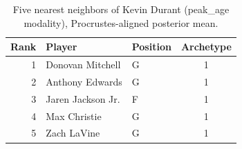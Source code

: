 \begin{table}[htbp]
  \centering\small
  \begin{tabular}{rllc}
    \toprule
    Rank & Player & Position & Archetype \\
    \midrule
    1 & Donovan Mitchell & G & 1 \\
    2 & Anthony Edwards & G & 1 \\
    3 & Jaren Jackson Jr. & F & 1 \\
    4 & Max Christie & G & 1 \\
    5 & Zach LaVine & G & 1 \\
    \bottomrule
  \end{tabular}
  \caption{Five nearest neighbors of Kevin Durant (peak_age modality), Procrustes-aligned posterior mean.}
  \label{tab:Kevin_Durant_neighbors_peak_age}
\end{table}

